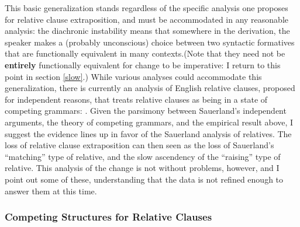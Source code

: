 This basic generalization stands regardless of the specific analysis one proposes for relative clause extraposition, and must be accommodated in any reasonable analysis: the diachronic instability means that somewhere in the derivation, the speaker makes a (probably unconscious) choice between two syntactic formatives that are functionally equivalent in many contexts.(Note that they need not be \textbf{entirely} functionally equivalent for change to be imperative: I return to this point in section \ref{slow}.) While various analyses could accommodate this generalization, there is currently an analysis of English relative clauses, proposed for independent reasons, that treats relative clauses as being in a state of competing grammars: \citet{sauerland2003}. Given the parsimony between Sauerland's independent arguments, the theory of competing grammars, and the empirical result above, I suggest the evidence lines up in favor of the Sauerland analysis of relatives. The loss of relative clause extraposition can then seen as the loss of Sauerland's ``matching'' type of relative, and the slow ascendency of the ``raising'' type of relative. This analysis of the change is not without problems, however, and I point out some of these, understanding that the data is not refined enough to answer them at this time.

\subsubsection{Competing Structures for Relative Clauses}


